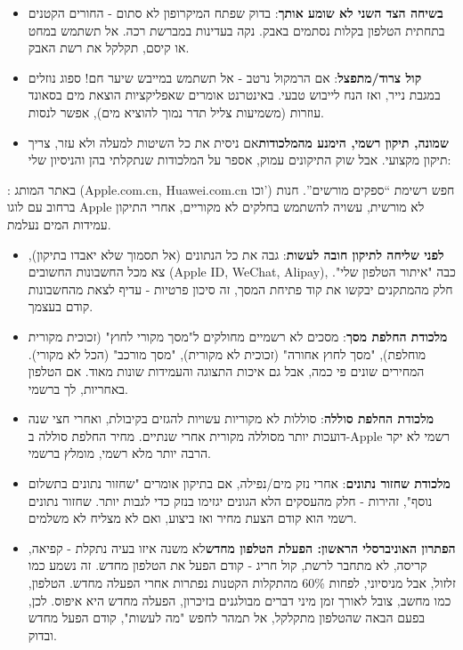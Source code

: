 \begin{itemize}
  \item \textbf{בשיחה הצד השני לא שומע אותך}: בדוק שפתח המיקרופון לא סתום - החורים הקטנים בתחתית הטלפון בקלות נסתמים באבק. נקה בעדינות במברשת רכה. אל תשתמש במחט או קיסם, תקלקל את רשת האבק.
  \item \textbf{קול צרוד/מתפצל}: אם הרמקול נרטב - אל תשתמש במייבש שיער חם! ספוג נוזלים במגבת נייר, ואז הנח לייבוש טבעי. באינטרנט אומרים שאפליקציות הוצאת מים בסאונד עוזרות (משמיעות צליל תדר נמוך להוציא מים), אפשר לנסות.
  \item \textbf{שמונה, תיקון רשמי, הימנע מהמלכודות}אם ניסית את כל השיטות למעלה ולא עזר, צריך תיקון מקצועי. אבל שוק התיקונים עמוק, אספר על המלכודות שנתקלתי בהן והניסיון שלי:
\end{itemize}


: באתר המותג (Apple.com.cn, Huawei.com.cn וכו') חפש רשימת “ספקים מורשים”. חנות ברחוב עם לוגו Apple לא מורשית, עשויה להשתמש בחלקים לא מקוריים, אחרי התיקון עמידות המים נעלמת.

\begin{itemize}
  \item \textbf{לפני שליחה לתיקון חובה לעשות}: גבה את כל הנתונים (אל תסמוך שלא יאבדו בתיקון), צא מכל החשבונות החשובים (Apple ID, WeChat, Alipay), כבה "איתור הטלפון שלי". חלק מהמתקנים יבקשו את קוד פתיחת המסך, זה סיכון פרטיות - עדיף לצאת מהחשבונות קודם בעצמך.
  \item \textbf{מלכודת החלפת מסך}: מסכים לא רשמיים מחולקים ל"מסך מקורי לחוץ" (זכוכית מקורית מוחלפת), "מסך לחוץ אחורה" (זכוכית לא מקורית), "מסך מורכב" (הכל לא מקורי). המחירים שונים פי כמה, אבל גם איכות התצוגה והעמידות שונות מאוד. אם הטלפון באחריות, לך ברשמי.
  \item \textbf{מלכודת החלפת סוללה}: סוללות לא מקוריות עשויות להגזים בקיבולת, ואחרי חצי שנה דועכות יותר מסוללה מקורית אחרי שנתיים. מחיר החלפת סוללה ב-Apple רשמי לא יקר הרבה יותר מלא רשמי, מומלץ ברשמי.
  \item \textbf{מלכודת שחזור נתונים}: אחרי נזק מים/נפילה, אם בתיקון אומרים "שחזור נתונים בתשלום נוסף", זהירות - חלק מהעסקים הלא הגונים יגזימו בנזק כדי לגבות יותר. שחזור נתונים רשמי הוא קודם הצעת מחיר ואז ביצוע, ואם לא מצליח לא משלמים.
  \item \textbf{הפתרון האוניברסלי הראשון: הפעלת הטלפון מחדש}לא משנה איזו בעיה נתקלת - קפיאה, קריסה, לא מתחבר לרשת, קול חריג - קודם הפעל את הטלפון מחדש. זה נשמע כמו זלזול, אבל מניסיוני, לפחות 60\% מהתקלות הקטנות נפתרות אחרי הפעלה מחדש. הטלפון, כמו מחשב, צובל לאורך זמן מיני דברים מבולגנים בזיכרון, הפעלה מחדש היא איפוס. לכן, בפעם הבאה שהטלפון מתקלקל, אל תמהר לחפש "מה לעשות", קודם הפעל מחדש ובדוק.
\end{itemize}

